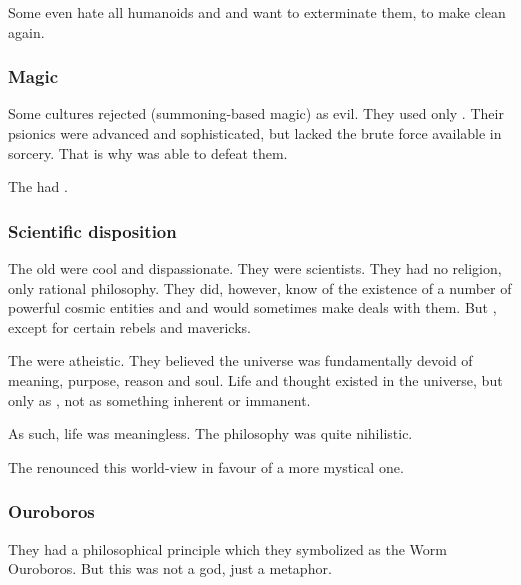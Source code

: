 
Some \trueophidians{} even hate all humanoids and \dragons{} and want to exterminate them, to make \Miith{} clean again.





\subsubsection{Magic}
Some \ophidian{} cultures rejected  (summoning-based magic) as evil. 
They used only . 
Their psionics were advanced and sophisticated, but lacked the brute force available in sorcery. 
That is why  was able to defeat them. 

The {\quiljaaran} had . 





\subsubsection{Scientific disposition}
The old \ophidians{} were cool and dispassionate. 
They were scientists. 
They had no religion, only rational philosophy. 
They did, however, know of the existence of a number of powerful cosmic entities and  and would sometimes make deals with them. 
But , except for certain rebels and mavericks. 

The \ophidians were atheistic. 
They believed the universe was fundamentally devoid of meaning, purpose, reason and soul.
Life and thought existed in the universe, but only as , not as something inherent or immanent. 

As such, life was meaningless. 
The \ophidian philosophy was quite nihilistic. 

The  renounced this world-view in favour of a more mystical one.





\subsubsection{Ouroboros}
They had a philosophical principle which they symbolized as the Worm Ouroboros. 
But this was not a god, just a metaphor. 

